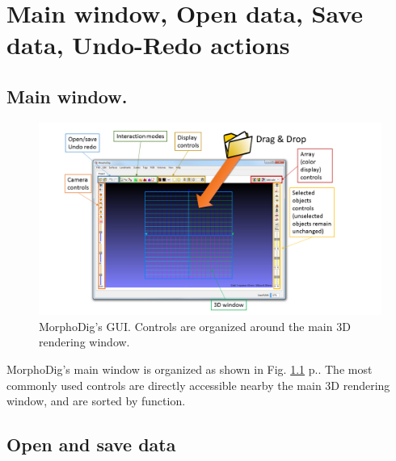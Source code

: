 \chapter{Main window, Open data, Save data, Undo-Redo actions}
\minitoc  

\section{Main window.}
\begin{figure}
  \centering
  \includegraphics[scale=0.6]{images/03/morphodig_gui.png} 
	\caption{MorphoDig's GUI. Controls are organized around the main 3D rendering window.}
\label{gui}
 
\end{figure}

MorphoDig's main window is organized as shown in Fig. \ref{gui} p.\pageref{gui}. The most commonly used controls are directly accessible nearby the main 3D rendering window, and are sorted by function. 

 \section{Open and save data}


